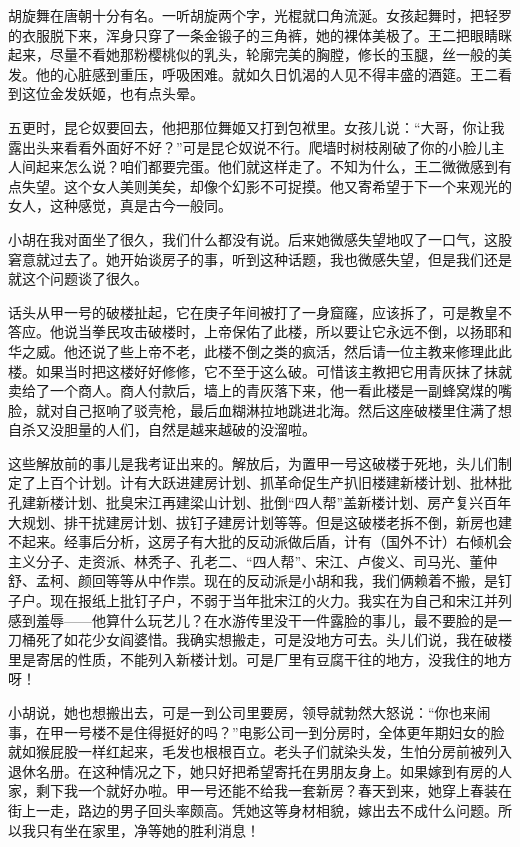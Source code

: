 胡旋舞在唐朝十分有名。一听胡旋两个字，光棍就口角流涎。女孩起舞时，把轻罗的衣服脱下来，浑身只穿了一条金锻子的三角裤，她的裸体美极了。王二把眼睛眯起来，尽量不看她那粉樱桃似的乳头，轮廓完美的胸膛，修长的玉腿，丝一般的美发。他的心脏感到重压，呼吸困难。就如久日饥渴的人见不得丰盛的酒筵。王二看到这位金发妖姬，也有点头晕。 

五更时，昆仑奴要回去，他把那位舞姬又打到包袱里。女孩儿说：“大哥，你让我露出头来看看外面好不好？”可是昆仑奴说不行。爬墙时树枝剐破了你的小脸儿主人间起来怎么说？咱们都要完蛋。他们就这样走了。不知为什么，王二微微感到有点失望。这个女人美则美矣，却像个幻影不可捉摸。他又寄希望于下一个来观光的女人，这种感觉，真是古今一般同。 

小胡在我对面坐了很久，我们什么都没有说。后来她微感失望地叹了一口气，这股窘意就过去了。她开始谈房子的事，听到这种话题，我也微感失望，但是我们还是就这个问题谈了很久。 

话头从甲一号的破楼扯起，它在庚子年间被打了一身窟窿，应该拆了，可是教皇不答应。他说当拳民攻击破楼时，上帝保佑了此楼，所以要让它永远不倒，以扬耶和华之威。他还说了些上帝不老，此楼不倒之类的疯活，然后请一位主教来修理此此楼。如果当时把这楼好好修修，它不至于这么破。可惜该主教把它用青灰抹了抹就卖给了一个商人。商人付款后，墙上的青灰落下来，他一看此楼是一副蜂窝煤的嘴脸，就对自己抠响了驳壳枪，最后血糊淋拉地跳进北海。然后这座破楼里住满了想自杀又没胆量的人们，自然是越来越破的没溜啦。 

这些解放前的事儿是我考证出来的。解放后，为置甲一号这破楼于死地，头儿们制定了上百个计划。计有大跃进建房计划、抓革命促生产扒旧楼建新楼计划、批林批孔建新楼计划、批臭宋江再建梁山计划、批倒“四人帮”盖新楼计划、房产复兴百年大规划、排干扰建房计划、拔钉子建房计划等等。但是这破楼老拆不倒，新房也建不起来。经事后分析，这房子有大批的反动派做后盾，计有（国外不计）右倾机会主义分子、走资派、林秃子、孔老二、“四人帮”、宋江、卢俊义、司马光、董仲舒、孟柯、颜回等等从中作祟。现在的反动派是小胡和我，我们俩赖着不搬，是钉子户。现在报纸上批钉子户，不弱于当年批宋江的火力。我实在为自己和宋江并列感到羞辱——他算什么玩艺儿？在水游传里没干一件露脸的事儿，最不要脸的是一刀桶死了如花少女阎婆惜。我确实想搬走，可是没地方可去。头儿们说，我在破楼里是寄居的性质，不能列入新楼计划。可是厂里有豆腐干往的地方，没我住的地方呀！ 

小胡说，她也想搬出去，可是一到公司里要房，领导就勃然大怒说：“你也来闹事，在甲一号楼不是住得挺好的吗？”电影公司一到分房时，全体更年期妇女的脸就如猴屁股一样红起来，毛发也根根百立。老头子们就染头发，生怕分房前被列入退休名册。在这种情况之下，她只好把希望寄托在男朋友身上。如果嫁到有房的人家，剩下我一个就好办啦。甲一号还能不给我一套新房？春天到来，她穿上春装在街上一走，路边的男子回头率颇高。凭她这等身材相貌，嫁出去不成什么问题。所以我只有坐在家里，净等她的胜利消息！ 

